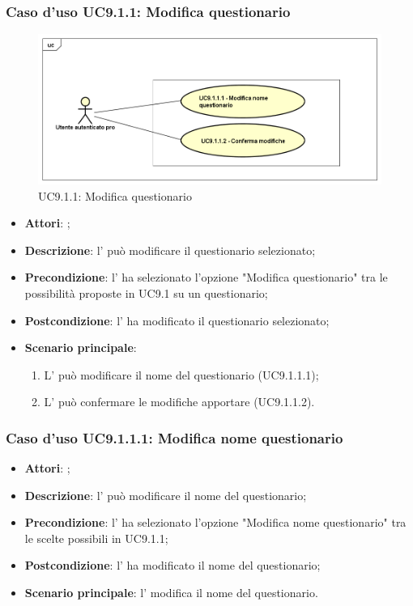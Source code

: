 			\subsubsection{Caso d'uso UC9.1.1: Modifica questionario}
			\label{UC9.1.1}
			\begin{figure}[h]
				\centering
			\includegraphics[scale=0.5,keepaspectratio]{UML/UC9_1_1.png}
				\caption{UC9.1.1: Modifica questionario}
			\end{figure}
			\FloatBarrier
			\begin{itemize}
				\item \textbf{Attori}: \uaupro{};
				\item \textbf{Descrizione}: l'\uaupro{} può modificare il questionario selezionato;
				\item \textbf{Precondizione}: l'\uaupro{} ha selezionato l'opzione "Modifica questionario" tra le possibilità proposte in UC9.1 su un questionario;
				\item \textbf{Postcondizione}: l'\uaupro{} ha modificato il questionario selezionato; 
				\item \textbf{Scenario principale}:
					\begin{enumerate}
						\item L'\uaupro{} può modificare il nome del questionario (UC9.1.1.1);
						\item L'\uaupro{} può confermare le modifiche apportare (UC9.1.1.2).
					\end{enumerate}
			\end{itemize}
								
					\subsubsection{Caso d'uso UC9.1.1.1: Modifica nome questionario}
					\label{UC9.1.1.1}
					\begin{itemize}
						\item \textbf{Attori}: \uaupro{};
						\item \textbf{Descrizione}: l'\uaupro{} può modificare il nome del questionario; 
						\item \textbf{Precondizione}: l'\uaupro{} ha selezionato l'opzione "Modifica nome questionario" tra le scelte possibili in UC9.1.1;
						\item \textbf{Postcondizione}: l'\uaupro{} ha modificato il nome del questionario; 
						\item \textbf{Scenario principale}: l'\uaupro{} modifica il nome del questionario.
					\end{itemize}
																					
